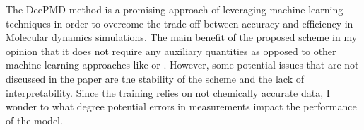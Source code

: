 \newline \newline
The DeePMD method is a promising approach of leveraging machine learning techniques in order to overcome the trade-off between accuracy and efficiency in Molecular dynamics simulations. The main benefit of the proposed scheme in my opinion that it does not require any auxiliary quantities as opposed to other machine learning approaches like \cite{Chmiela_2017} or \cite{PhysRevLett.98.146401}. However, some potential issues that are not discussed in the paper are the stability of the scheme and the lack of interpretability. Since the training relies on not chemically accurate data, I wonder to what degree potential errors in measurements impact the performance of the model. 
